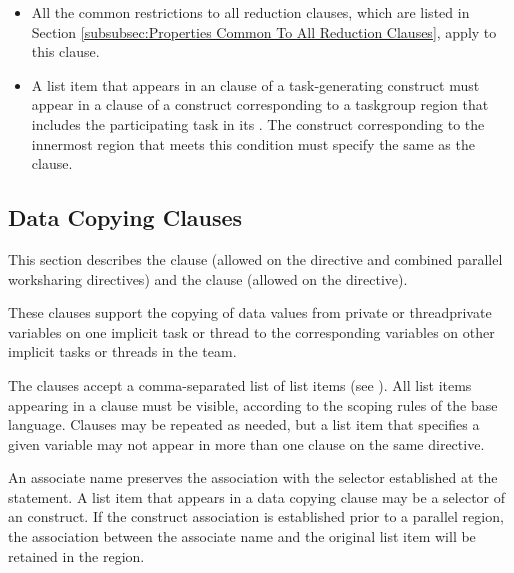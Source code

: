 \begin{itemize}
\item All the common restrictions to all reduction clauses, which are listed in
Section \ref{subsubsec:Properties Common To All Reduction Clauses}, apply to
this clause.


\item A list item that appears in an  clause of a
task-generating construct must appear in a  clause of a construct
corresponding to a taskgroup region that includes the participating task in its
. The construct corresponding to the innermost region that meets
this condition must specify the same  as the
 clause.
\end{itemize}










\subsection{Data Copying Clauses}
\label{subsec:Data Copying Clauses}
This section describes the  clause (allowed on the  directive and
combined parallel worksharing directives) and the  clause (allowed on
the  directive).

These clauses support the copying of data values from private or threadprivate variables
on one implicit task or thread to the corresponding variables on other implicit tasks or
threads in the team.

The clauses accept a comma-separated list of list items (see ).
All list items appearing in a clause must be visible, according to the scoping rules of the
base language. Clauses may be repeated as needed, but a list item that specifies a given
variable may not appear in more than one clause on the same directive.

\begin{fortranspecific}
An associate name preserves the association with the selector established at the  statement. A list item that appears in a data copying clause may be a selector of an  construct. If the construct association is established prior to a parallel region, the association between the associate name and the original list item will be retained in the region.
\end{fortranspecific}







